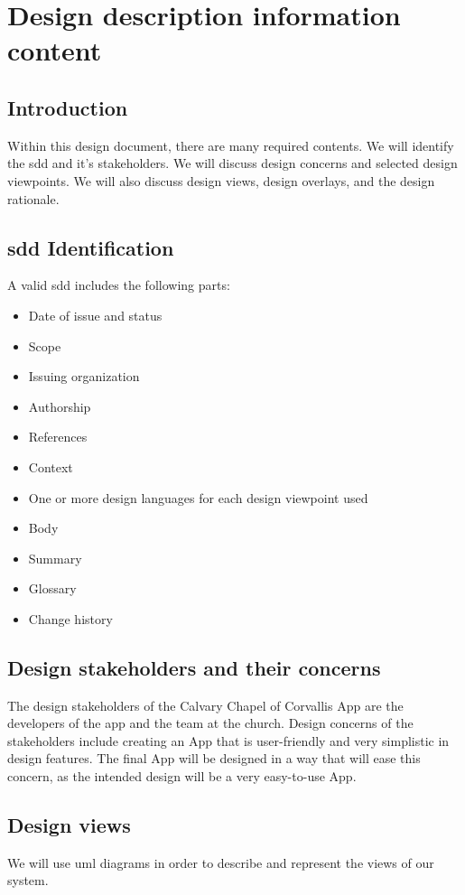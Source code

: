 \documentclass[letterpaper,10pt,draftclsnofoot,onecolumn,titlepage]{IEEEtran}
\begin{document}
	\section{Design description information content}

		\subsection{Introduction}
			Within this design document, there are many required contents.
			We will identify the \gls{sdd} and it's stakeholders.
			We will discuss design concerns and selected design viewpoints.
			We will also discuss design views, design overlays, and the design rationale.

		\subsection{\gls{sdd} Identification}
			A valid \gls{sdd} includes the following parts:
			\begin{itemize}
				\item{Date of issue and status}
				\item{Scope}
				\item{Issuing organization}
				\item{Authorship}
				\item{References}
				\item{Context}
				\item{One or more design languages for each design viewpoint used}
				\item{Body}
				\item{Summary}
				\item{Glossary}
				\item{Change history}
			\end{itemize}

		\subsection{Design stakeholders and their concerns}
			The design stakeholders of the Calvary Chapel of Corvallis \gls{App} are the developers of the app and the team at the church.
			Design concerns of the stakeholders include creating an \gls{App} that is user-friendly and very simplistic in design features.
			The final \gls{App} will be designed in a way that will ease this concern, as the intended design will be a very easy-to-use \gls{App}.

		\subsection{Design views}
		We will use \gls{uml} diagrams in order to describe and represent the views of our system.
\end{document}
